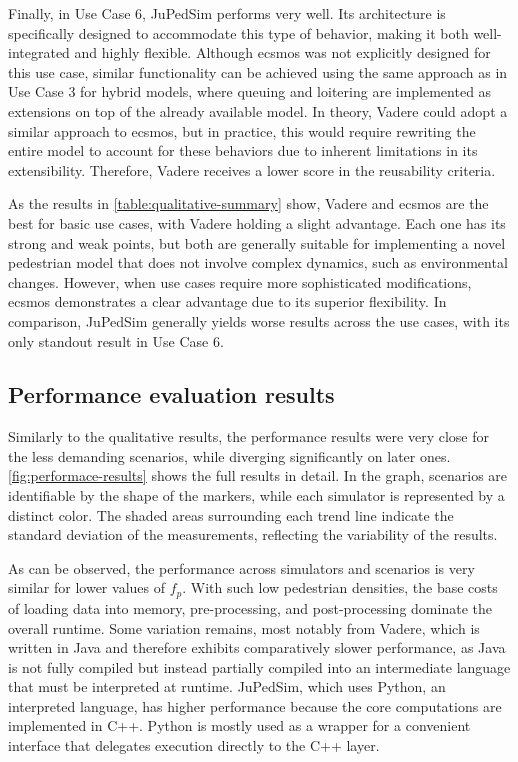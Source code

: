 \documentclass[twoside, 11pt]{article}
\begin{document}
Finally, in Use Case 6, JuPedSim performs very well. Its architecture is specifically designed to accommodate this type of behavior, making it both well-integrated and highly flexible. Although \gls{ecsmos} was not explicitly designed for this use case, similar functionality can be achieved using the same approach as in Use Case 3 for hybrid models, where queuing and loitering are implemented as extensions on top of the already available model. In theory, Vadere could adopt a similar approach to \gls{ecsmos}, but in practice, this would require rewriting the entire model to account for these behaviors due to inherent limitations in its extensibility. Therefore, Vadere receives a lower score in the reusability criteria.


As the results in \autoref{table:qualitative-summary} show, Vadere and \gls{ecsmos} are the best for basic use cases, with Vadere holding a slight advantage. Each one has its strong and weak points, but both are generally suitable for implementing a novel pedestrian model that does not involve complex dynamics, such as environmental changes. However, when use cases require more sophisticated modifications, \gls{ecsmos} demonstrates a clear advantage due to its superior flexibility. In comparison, JuPedSim generally yields worse results across the use cases, with its only standout result in Use Case 6.


\subsection{Performance evaluation results}

Similarly to the qualitative results, the performance results were very close for the less demanding scenarios, while diverging significantly on later ones. \autoref{fig:performace-results} shows the full results in detail. In the graph, scenarios are identifiable by the shape of the markers, while each simulator is represented by a distinct color. The shaded areas surrounding each trend line indicate the standard deviation of the measurements, reflecting the variability of the results.

As can be observed, the performance across simulators and scenarios is very similar for lower values of $f_p$. With such low pedestrian densities, the base costs of loading data into memory, pre-processing, and post-processing dominate the overall runtime. Some variation remains, most notably from Vadere, which is written in Java and therefore exhibits comparatively slower performance, as Java is not fully compiled but instead partially compiled into an intermediate language that must be interpreted at runtime. JuPedSim, which uses Python, an interpreted language, has higher performance because the core computations are implemented in C++. Python is mostly used as a wrapper for a convenient interface that delegates execution directly to the C++ layer.
\end{document}
